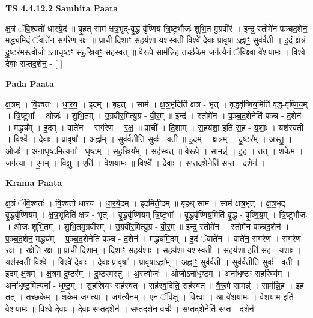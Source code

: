 \documentclass[17pt]{extarticle}
\begin{document}
\textbf{TS 4.4.12.2 } \newline
\textbf{Samhita Paata} \newline

क्ष॒त्रं ॅवि॒श्वतो॑ धारये॒दं ॥ बृ॒हत् साम॑ क्षत्र॒भृद्-वृ॒द्ध वृ॑ष्णियं त्रि॒ष्टुभौजः॑ शुभि॒त मु॒ग्रवी॑रं । इन्द्र॒ स्तोमे॑न पञ्चद॒शेन॒ मद्ध्य॑मि॒दं ॅवाते॑न॒ सग॑रेण रक्ष ॥ प्राची॑ दि॒शाꣳ स॒हय॑शा॒ यश॑स्वती॒ विश्वे॑ देवाः प्रा॒वृषा ऽह्नाꣳ॒॒ सुव॑र्वती । इ॒दं क्ष॒त्रं दु॒ष्टर॑म॒स्त्वोजो ऽना॑धृष्टꣳ सह॒स्रियꣳ॒॒ सह॑स्वत् ॥ वै॒रू॒पे साम॑न्नि॒ह तच्छ॑केम॒ जग॑त्यैनं ॅवि॒क्ष्वा वे॑शयामः । विश्वे॑ देवाः सप्तद॒शेन॒ - [  ] \newline

\textbf{Pada Paata} \newline

क्ष॒त्रम् । वि॒श्वतः॑ । धा॒र॒य॒ । इ॒दम् ॥ बृ॒हत् । साम॑ । क्ष॒त्र॒भृदिति॑ क्षत्र - भृत् । वृ॒द्धवृ॑ष्णिय॒मिति॑ वृ॒द्ध-वृ॒ष्णि॒य॒म् । त्रि॒ष्टुभा᳚ । ओजः॑ । शु॒भि॒तम् । उ॒ग्रवी॑र॒मित्यु॒ग्र - वी॒र॒म् ॥ इन्द्र॑ । स्तोमे॑न । प॒ञ्च॒द॒शेनेति॑ पञ्च - द॒शेन॑ । मद्ध्य᳚म् । इ॒दम् । वाते॑न । सग॑रेण । र॒क्ष॒ ॥ प्राची᳚ । दि॒शाम् । स॒हय॑शा॒ इति॑ स॒ह - य॒शाः॒ । यश॑स्वती । विश्वे᳚ । दे॒वाः॒ । प्रा॒वृषा᳚ । अह्ना᳚म् । सुव॑र्व॒तीति॒ सुवः॑ - व॒ती॒ ॥ इ॒दम् । क्ष॒त्रम् । दु॒ष्टर᳚म् । अ॒स्तु॒ । ओजः॑ । अना॑धृष्ट॒मित्यना᳚ - धृ॒ष्ट॒म् । स॒ह॒स्रिय᳚म् । सह॑स्वत् ॥ वै॒रू॒पे । सामन्न्॑ । इ॒ह । तत् । श॒के॒म॒ । जग॑त्या । ए॒न॒म् । वि॒क्षु । एति॑ । वे॒श॒या॒मः॒ ॥ विश्वे᳚ । दे॒वाः॒ । स॒प्त॒द॒शेनेति॑ सप्त - द॒शेन॑ ।  \newline


\textbf{Krama Paata} \newline

क्ष॒त्रं ॅवि॒श्वतः॑ । वि॒श्वतो॑ धारय । धा॒र॒ये॒दम् । इ॒दमिती॒दम् ॥ बृ॒हथ् साम॑ । साम॑ क्षत्र॒भृत् । क्ष॒त्र॒भृद् वृ॒द्धवृ॑ष्णियम् । क्ष॒त्र॒भृदिति॑ क्षत्र - भृत् । वृ॒द्धवृ॑ष्णियम् त्रि॒ष्टुभा᳚ । वृ॒द्धवृ॑ष्णिय॒मिति॑ वृ॒द्ध - वृ॒ष्णि॒य॒म् । त्रि॒ष्टुभौजः॑ । ओजः॑ शुभि॒तम् । शु॒भि॒तमु॒ग्रवी॑रम् । उ॒ग्रवी॑र॒मित्यु॒ग्र - वी॒र॒म् ॥ इन्द्र॒ स्तोमे॑न । स्तोमे॑न पञ्चद॒शेन॑ । प॒ञ्च॒द॒शेन॒ मद्ध्य᳚म् । प॒ञ्च॒द॒शेनेति॑ पञ्च - द॒शेन॑ । मद्ध्य॑मि॒दम् । इ॒दं ॅवाते॑न । वाते॑न॒ सग॑रेण । सग॑रेण रक्ष । र॒क्षेति॑ रक्ष ॥ प्राची॑ दि॒शाम् । दि॒शाꣳ स॒हय॑शाः । स॒हय॑शा॒ यश॑स्वती । स॒हय॑शा॒ इति॑ स॒ह - य॒शाः॒ । यश॑स्वती॒ विश्वे᳚ । विश्वे॑ देवाः । दे॒वाः॒ प्रा॒वृषा᳚ । प्रा॒वृषाऽह्ना᳚म् । अह्नाꣳ॒॒ सुव॑र्वती । सुव॑र्व॒तीति॒ सुवः॑ - व॒ती॒ ॥ इ॒दम् क्ष॒त्रम् । क्ष॒त्रम् दु॒ष्टर᳚म् । दु॒ष्टर॑मस्तु । अ॒स्त्वोजः॑ । ओजोऽना॑धृष्टम् । अना॑धृष्टꣳ सह॒स्रिय᳚म् । अना॑धृष्ट॒मित्यना᳚ - धृ॒ष्ट॒म् । स॒ह॒स्रियꣳ॒॒ सह॑स्वत् । सह॑स्व॒दिति॒ सह॑स्वत् ॥ वै॒रू॒पे सामन्न्॑ । साम॑न्नि॒ह । इ॒ह तत् । तच्छ॑केम । श॒के॒म॒ जग॑त्या । जग॑त्यैनम् । ए॒नं॒ ॅवि॒क्षु । वि॒क्ष्वा । आ वे॑शयामः । वे॒श॒या॒म॒ इति॑ वेशयामः ॥ विश्वे॑ देवाः । दे॒वाः॒ स॒प्त॒द॒शेन॑ । स॒प्त॒द॒शेन॒ वर्चः॑ । स॒प्त॒द॒शेनेति॑ सप्त - द॒शेन॑ \newline
\end{document}
